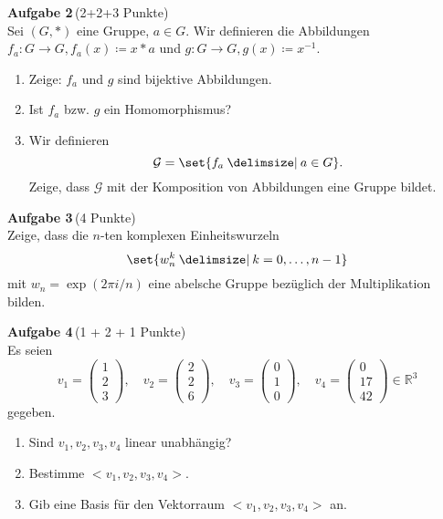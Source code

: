 \documentclass[11pt]{report} %
\providecommand\given{}
\newcommand\SetSymbol[1][]{%
	\nonscript\:#1\vert
	\allowbreak
	\nonscript\:
	\mathopen{}
}
\renewcommand\given{\SetSymbol[\delimsize]}
\newcommand\bR{\mathbb{R}}
\begin{document}
	\medskip\noindent
	{\bf Aufgabe 2}\,(2+2+3 Punkte)\\
		Sei $(G, \ast)$ eine Gruppe, $a \in G$. Wir definieren die Abbildungen $f_a: G \rightarrow G, f_a(x) \coloneq x \ast a$ und $g: G \rightarrow G, g(x) \coloneq x^{-1}$.
		\begin{enumerate}
			\item 
				Zeige: $f_a$ und $g$ sind bijektive Abbildungen.
				
			\item 
				Ist $f_a$ bzw. $g$ ein Homomorphismus?
		
			\item 
				Wir definieren
				\begin{equation*}
					\mathcal{G} = \set{f_a \given a \in G}.
				\end{equation*}
				Zeige, dass $\mathcal{G}$ mit der Komposition von Abbildungen eine Gruppe bildet.
		\end{enumerate}
		
	\medskip\noindent
	{\bf Aufgabe 3}\,(4 Punkte)\\
		Zeige, dass die $n$-ten  komplexen Einheitswurzeln
		\begin{equation*}
			\set{w_n^k \given k = 0, \ldots, n-1}
		\end{equation*}
		mit $w_n = \exp(2\pi i / n)$ eine abelsche Gruppe bezüglich der Multiplikation bilden.
		
	\medskip\noindent
	{\bf Aufgabe 4}\,(1 + 2 + 1 Punkte)\\
		Es seien
		\begin{equation*}
			v_1 = \begin{pmatrix} 1 \\ 2 \\ 3 \end{pmatrix}, \quad v_2 = \begin{pmatrix} 2 \\ 2 \\ 6 \end{pmatrix}, \quad v_3 = \begin{pmatrix} 0 \\ 1 \\ 0 \end{pmatrix}, \quad v_4 = \begin{pmatrix} 0 \\ 17 \\ 42 \end{pmatrix} \in \bR^3
		\end{equation*}
		gegeben.
		\begin{enumerate}
			\item 
				Sind $v_1, v_2, v_3, v_4$ linear unabhängig?
				
			\item 
				Bestimme $<v_1, v_2, v_3, v_4>$.
				
			\item 
				Gib eine Basis für den Vektorraum $<v_1, v_2, v_3, v_4>$ an.
		\end{enumerate}
				
\end{document}
